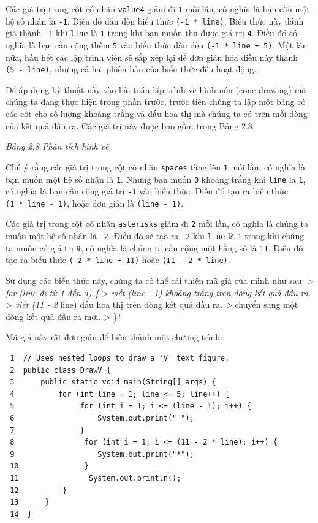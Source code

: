 Các giá trị trong cột có nhãn \texttt{value4} giảm đi \texttt{1} mỗi
lần, có nghĩa là bạn cần một hệ số nhân là \texttt{-1}. Điều đó dẫn đến
biểu thức \texttt{(-1\ *\ line)}. Biểu thức này đánh giá thành
\texttt{-1} khi \texttt{line} là \texttt{1} trong khi bạn muốn thu được
giá trị \texttt{4}. Điều đó có nghĩa là bạn cần cộng thêm \texttt{5} vào
biểu thức dẫn đến \texttt{(-1\ *\ line\ +\ 5)}. Một lần nữa, hầu hết các
lập trình viên sẽ sắp xếp lại để đơn giản hóa điều này thành
\texttt{(5\ -\ line)}, nhưng cả hai phiên bản của biểu thức đều hoạt
động.

Để áp dụng kỹ thuật này vào bài toán lập trình vẽ hình nón
(cone-drawing) mà chúng ta đang thực hiện trong phần trước, trước tiên
chúng ta lập một bảng có các cột cho số lượng khoảng trắng và dấu hoa
thị mà chúng ta có trên mỗi dòng của kết quả đầu ra. Các giá trị này
được bao gồm trong Bảng 2.8.

\emph{Bảng 2.8 Phân tích hình vẽ}

Chú ý rằng các giá trị trong cột có nhãn \texttt{spaces} tăng lên
\texttt{1} mỗi lần, có nghĩa là bạn muốn một hệ số nhân là \texttt{1}.
Nhưng bạn muốn \texttt{0} khoảng trắng khi \texttt{line} là \texttt{1},
có nghĩa là bạn cần cộng giá trị \texttt{-1} vào biểu thức. Điều đó tạo
ra biểu thức \texttt{(1\ *\ line\ -\ 1)}, hoặc đơn giản là
\texttt{(line\ -\ 1)}.

Các giá trị trong cột có nhãn \texttt{asterisks} giảm đi \texttt{2} mỗi
lần, có nghĩa là chúng ta muốn một hệ số nhân là \texttt{-2}. Điều đó sẽ
tạo ra \texttt{-2} khi \texttt{line} là \texttt{1} trong khi chúng ta
muốn có giá trị \texttt{9}, có nghĩa là chúng ta cần cộng một hằng số là
\texttt{11}. Điều đó tạo ra biểu thức \texttt{(-2\ *\ line\ +\ 11)} hoặc
\texttt{(11\ -\ 2\ *\ line)}.

Sử dụng các biểu thức này, chúng ta có thể cải thiện mã giả của mình như
sau: \textgreater{} \emph{for (line đi từ 1 đến 5) \{} \textgreater{}
\emph{viết (line - 1) khoảng trắng trên dòng kết quả đầu ra.}
\textgreater{} \emph{viết (11 - 2 } line) dấu hoa thị trên dòng kết quả
đầu ra.\emph{ \textgreater{} }chuyển sang một dòng kết quả đầu ra
mới.\emph{ \textgreater{} }\}*

Mã giả này rất đơn giản để biến thành một chương trình:

\begin{verbatim}
 1  // Uses nested loops to draw a 'V' text figure.
 2  public class DrawV {
 3      public static void main(String[] args) {
 4          for (int line = 1; line <= 5; line++) {
 5               for (int i = 1; i <= (line - 1); i++) {
 6                   System.out.print(" ");
 7               }
 8                for (int i = 1; i <= (11 - 2 * line); i++) {
 9                   System.out.print("*");
 10               }
 11                System.out.println();
 12          }
 13      }
 14  }
\end{verbatim}

